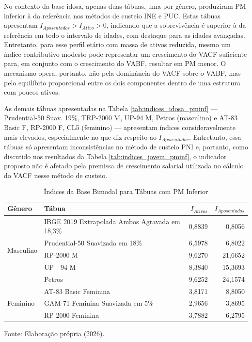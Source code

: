 No contexto da base idosa, apenas duas tábuas, uma por gênero, produziram PM inferior à da referência nos métodos de custeio INE e PUC. Estas tábuas apresentam $I_{Aposentados} > I_{Ativo} > 0$, indicando que a sobrevivência é superior à da referência em todo o intervalo de idades, com destaque para as idades avançadas. Entretanto, para esse perfil etário com massa de ativos reduzida, mesmo um índice contributivo modesto pode representar um crescimento do VACF suficiente para, em conjunto com o crescimento do VABF, resultar em PM menor. O mecanismo opera, portanto, não pela dominância do VACF sobre o VABF, mas pelo equilíbrio proporcional entre os dois componentes dentro de uma estrutura com poucos ativos.

As demais tábuas apresentadas na Tabela \ref{tab:indices_idosa_pminf} — Prudential-50 Suav. 19\%, TRP-2000 M, UP-94 M, Petros (masculino) e AT-83 Basic F, RP-2000 F, CL5 (feminino) — apresentam índices consideravelmente mais elevados, especialmente no que diz respeito ao $I_{Aposentados}$. Entretanto, essa tábuas só apresentam inconsistências no método de custeio PNI e, portanto, como discutido nos resultados da Tabela \ref{tab:indices_jovem_pminf}, o indicador proposto não é afetado pela premissa de crescimento salarial utilizada no cálculo do VACF nesse método de custeio.

\newpage
\begin{table}[htbp]
    \centering
    \caption{Índices da Base Bimodal para Tábuas com PM Inferior}
    \begin{threeparttable}
    \renewcommand{\arraystretch}{1.0}
    \begin{tabular}{llrr}
    \toprule
    \textbf{Gênero} & \textbf{Tábua} & \textbf{$I_{Ativos}$} & \textbf{$I_{Aposentados}$} \\ 
    \midrule
    \multirow{5}{*}{Masculino} 
        & IBGE 2019 Extrapolada Ambos Agravada em 18,3\% & 0,8839 & 0,8056 \\
        & Prudential-50 Suavizada em 18\%         & 6,5978 & 6,8022 \\
        & RP-2000 M                        & 9,6270 & 21,6652 \\
        & UP - 94 M                        & 8,3840 & 15,3693 \\
        & Petros                           & 9,6252 & 24,1574 \\ \hline
    \multirow{3}{*}{Feminino}
        & AT-83 Basic Feminina      & 3,8171 & 8,8050 \\
        & GAM-71 Feminina Suavizada em 5\%  & 2,9656 & 3,8695 \\
        & RP-2000 Feminina          & 3,7882 & 6,2795 \\
    \bottomrule
    \end{tabular}
    \begin{tablenotes}[flushleft]
        \small
        \item Fonte: Elaboração própria (2026).
    \end{tablenotes}
    \end{threeparttable}
    \label{tab:indices_bimodal_pminf}
\end{table}

